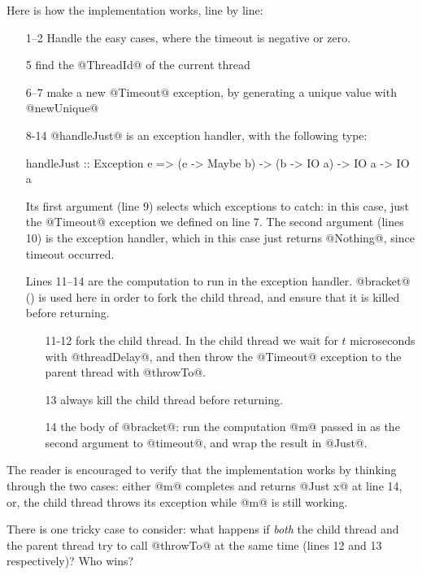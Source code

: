 Here is how the implementation works, line by line:

\begin{itemize}
\item[1--2] Handle the easy cases, where the timeout is
  negative or zero.
\item[5] find the @ThreadId@ of the current thread
\item[6--7] make a new @Timeout@ exception, by generating a unique value
  with @newUnique@
\item[8-14] @handleJust@ is an exception handler, with the following
  type:
\begin{haskell}
handleJust :: Exception e
           => (e -> Maybe b) -> (b -> IO a) -> IO a
           -> IO a
\end{haskell}
  Its first argument (line 9) selects which exceptions to catch: in
  this case, just the @Timeout@ exception we defined on line 7.  The
  second argument (lines 10) is the exception handler, which in this
  case just returns @Nothing@, since timeout occurred.

  Lines 11--14 are the computation to run in the exception handler.
  @bracket@ () is used here in order to fork
  the child thread, and ensure that it is killed before returning.

  \begin{itemize}
    \item[11-12] fork the child thread.  In the child thread we wait
      for $t$ microseconds with @threadDelay@, and then throw the
      @Timeout@ exception to the parent thread with @throwTo@.
    \item [13] always kill the child thread before returning.
    \item [14] the body of @bracket@: run the computation @m@ passed
      in as the second argument to @timeout@, and wrap the result in
      @Just@.
  \end{itemize}
\end{itemize}

The reader is encouraged to verify that the implementation works by
thinking through the two cases: either @m@ completes and returns
@Just x@ at line 14, or, the child thread throws its exception while
@m@ is still working.

There is one tricky case to consider: what happens if \emph{both} the
child thread and the parent thread try to call @throwTo@ at the same
time (lines 12 and 13 respectively)?  Who wins?

